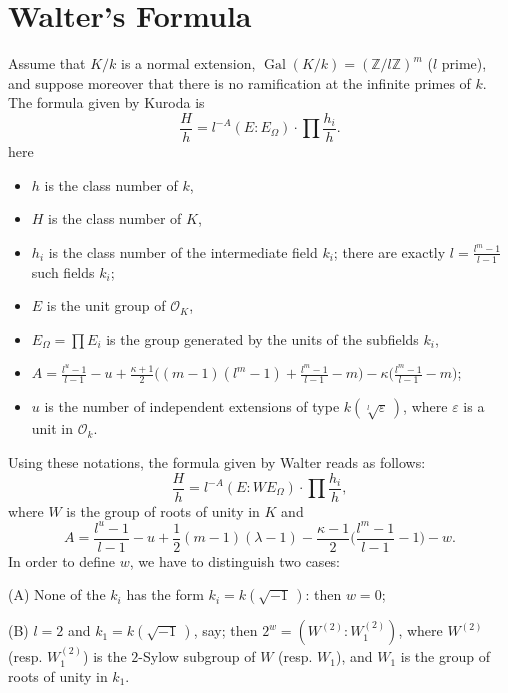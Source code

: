 \documentclass{amsart}
\newcommand{\Z}{\mathbb Z}
\newcommand{\eps}{\varepsilon}
\newcommand{\OO}{{\mathcal O}}
\newcommand{\Gal}{\operatorname{Gal}}
\begin{document}
\section{Walter's Formula}
Assume that $K/k$ is a normal extension, $\Gal(K/k) = (\Z/l\Z)^m$
($l$ prime), and suppose moreover that there is no ramification
at the infinite primes of $k$. The formula given by Kuroda
\cite{Kur2} is
$$ \frac{H}h = l^{-A} (E : E_\Omega) \cdot \prod \frac{h_i}h. $$
here
\begin{itemize}
\item $h$ is the class number of $k$,
\item $H$ is the class number of $K$,
\item $h_i$ is the class number of the intermediate field $k_i$;
      there are exactly $l = \frac{l^m-1}{l-1}$ such fields $k_i$;
\item $E$ is the unit group of $\OO_K$,
\item $E_\Omega = \prod E_i$ is the group generated by the units of
      the subfields $k_i$,
\item $A = \frac{l^u-1}{l-1} - u + \frac{\kappa+1}2
      \Big( (m-1)(l^m-1) + \frac{l^m-1}{l-1} - m\Big)
      - \kappa\Big( \frac{l^m-1}{l-1} - m\Big)$;
\item $u$ is the number of independent extensions of type
      $k(\sqrt[l]{\eps}\,)$, where $\eps$ is a unit in $\OO_k$.
\end{itemize}
Using these notations, the formula given by Walter \cite{Wal}
reads as follows:
$$ \frac{H}h = l^{-A} (E:WE_\Omega) \cdot \prod \frac{h_i}h,$$
where $W$ is the group of roots of unity in $K$ and
$$ A = \frac{l^u-1}{l-1} - u + \frac12(m-1)(\lambda-1)
        - \frac{\kappa-1}2\Big(\frac{l^m-1}{l-1} - 1\Big) - w.$$
In order to define $w$, we have to distinguish two cases:

\medskip \noindent
(A) None of the $k_i$ has the form $k_i = k(\sqrt{-1}\,)$:
    then $w = 0$;

\medskip \noindent
(B) $l=2$ and $k_1 = k(\sqrt{-1}\,)$, say; then
    $2^w = (W^{(2)}:W_1^{(2)})$, where $W^{(2)}$
    (resp. $W_1^{(2)}$) is the $2$-Sylow subgroup of $W$
    (resp. $W_1$), and $W_1$ is the group of roots of
    unity in $k_1$.
\medskip
\end{document}
